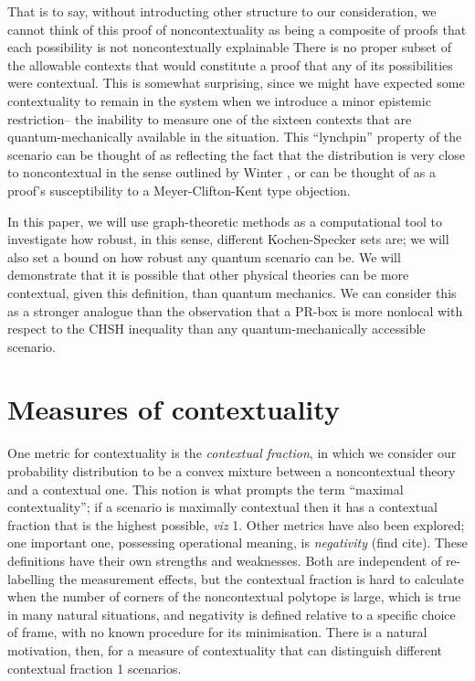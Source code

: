 \documentclass{amsart}
\theoremstyle{definition}
\begin{document}
That is to say, without introducting other structure to our consideration, we cannot think of this proof of noncontextuality as being a composite of proofs that each possibility is not noncontextually explainable There is no proper subset of the allowable contexts that would constitute a proof that any of its possibilities were contextual. This is somewhat surprising, since we might have expected some contextuality to remain in the system when we introduce a minor epistemic restriction-- the inability to measure one of the sixteen contexts that are quantum-mechanically available in the situation. This ``lynchpin'' property of the scenario can be thought of as reflecting the fact that the distribution is very close to noncontextual in the sense outlined by Winter \cite{Wint2014}, or can be thought of as a proof's susceptibility to a Meyer-Clifton-Kent type objection.

In this paper, we will use graph-theoretic methods as a computational tool to investigate how robust, in this sense, different Kochen-Specker sets are; we will also set a bound on how robust any quantum scenario can be. We will demonstrate that it is possible that other physical theories can be more contextual, given this definition, than quantum mechanics. We can consider this as a stronger analogue than the observation that a PR-box is more nonlocal with respect to the CHSH inequality than any quantum-mechanically accessible scenario.



\section{Measures of contextuality}

One metric for contextuality is the \emph{contextual fraction},\cite{Abra2017} in which we consider our probability distribution to be a convex mixture between a noncontextual theory and a contextual one. This notion is what prompts the term ``maximal contextuality''; if a scenario is maximally contextual then it has a contextual fraction that is the highest possible, \emph{viz} 1. Other metrics have also been explored; one important one, possessing operational meaning, is \emph{negativity} (find cite). These definitions have their own strengths and weaknesses. Both are independent of re-labelling the measurement effects, but the contextual fraction is hard to calculate when the number of corners of the noncontextual polytope is large, which is true in many natural situations, and negativity is defined relative to a specific choice of frame, with no known procedure for its minimisation. There is a natural motivation, then, for a measure of contextuality that can distinguish different contextual fraction 1 scenarios.
\end{document}
